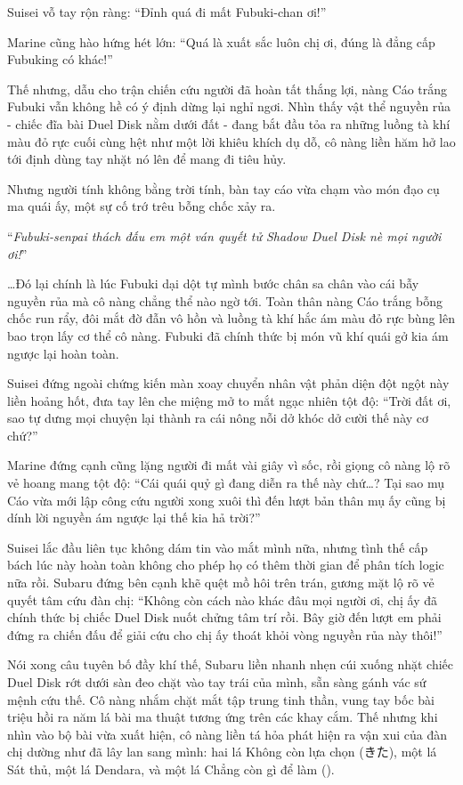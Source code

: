 \documentclass[../main.tex]{subfiles}
\begin{document}
Suisei vỗ tay rộn ràng: ``Đỉnh quá đi mất Fubuki-chan ơi!''

Marine cũng hào hứng hét lớn: ``Quá là xuất sắc luôn chị ơi, đúng là đẳng cấp Fubuking có khác!''

Thế nhưng, dẫu cho trận chiến cứu người đã hoàn tất thắng lợi, nàng Cáo trắng Fubuki vẫn không hề có ý định dừng lại nghỉ ngơi. Nhìn thấy vật thể nguyền rủa - chiếc đĩa bài Duel Disk nằm dưới đất - đang bắt đầu tỏa ra những luồng tà khí màu đỏ rực cuối cùng hệt như một lời khiêu khích dụ dỗ, cô nàng liền hăm hở lao tới định dùng tay nhặt nó lên để mang đi tiêu hủy.

Nhưng người tính không bằng trời tính, bàn tay cáo vừa chạm vào món đạo cụ ma quái ấy, một sự cố trớ trêu bỗng chốc xảy ra.

``\textit{Fubuki-senpai thách đấu em một ván quyết tử Shadow Duel Disk nè mọi người ơi!}''

\dots Đó lại chính là lúc Fubuki dại dột tự mình bước chân sa chân vào cái bẫy nguyền rủa mà cô nàng chẳng thể nào ngờ tới. Toàn thân nàng Cáo trắng bỗng chốc run rẩy, đôi mắt đờ đẫn vô hồn và luồng tà khí hắc ám màu đỏ rực bùng lên bao trọn lấy cơ thể cô nàng. Fubuki đã chính thức bị món vũ khí quái gở kia ám ngược lại hoàn toàn.


Suisei đứng ngoài chứng kiến màn xoay chuyển nhân vật phản diện đột ngột này liền hoảng hốt, đưa tay lên che miệng mở to mắt ngạc nhiên tột độ: ``Trời đất ơi, sao tự dưng mọi chuyện lại thành ra cái nông nỗi dở khóc dở cười thế này cơ chứ?''

Marine đứng cạnh cũng lặng người đi mất vài giây vì sốc, rồi giọng cô nàng lộ rõ vẻ hoang mang tột độ: ``Cái quái quỷ gì đang diễn ra thế này chứ\dots? Tại sao mụ Cáo vừa mới lập công cứu người xong xuôi thì đến lượt bản thân mụ ấy cũng bị dính lời nguyền ám ngược lại thế kia hả trời?''

Suisei lắc đầu liên tục không dám tin vào mắt mình nữa, nhưng tình thế cấp bách lúc này hoàn toàn không cho phép họ có thêm thời gian để phân tích logic nữa rồi. Subaru đứng bên cạnh khẽ quệt mồ hôi trên trán, gương mặt lộ rõ vẻ quyết tâm cứu đàn chị: ``Không còn cách nào khác đâu mọi người ơi, chị ấy đã chính thức bị chiếc Duel Disk nuốt chửng tâm trí rồi. Bây giờ đến lượt em phải đứng ra chiến đấu để giải cứu cho chị ấy thoát khỏi vòng nguyền rủa này thôi!''

Nói xong câu tuyên bố đầy khí thế, Subaru liền nhanh nhẹn cúi xuống nhặt chiếc Duel Disk rớt dưới sàn đeo chặt vào tay trái của mình, sẵn sàng gánh vác sứ mệnh cứu thế. Cô nàng nhắm chặt mắt tập trung tinh thần, vung tay bốc bài triệu hồi ra năm lá bài ma thuật tương ứng trên các khay cắm. Thế nhưng khi nhìn vào bộ bài vừa xuất hiện, cô nàng liền tá hỏa phát hiện ra vận xui của đàn chị dường như đã lây lan sang mình: hai lá Không còn lựa chọn (きた), một lá Sát thủ, một lá Dendara, và một lá Chẳng còn gì để làm ().
\end{document}
